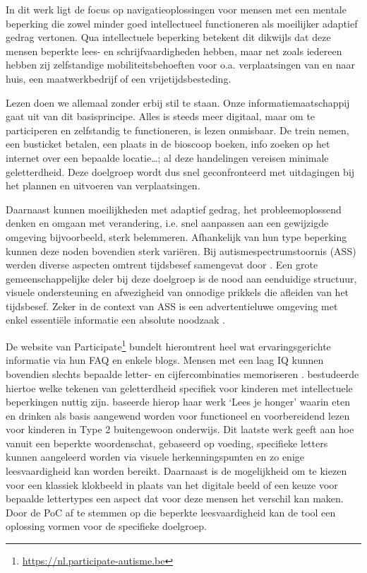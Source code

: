 In dit werk ligt de focus op navigatieoplossingen voor mensen met een mentale beperking die zowel minder goed intellectueel functioneren als moeilijker adaptief gedrag vertonen. Qua intellectuele beperking betekent dit dikwijls dat deze mensen beperkte lees- en schrijfvaardigheden hebben, maar net zoals iedereen hebben zij zelfstandige mobiliteitsbehoeften voor o.a. verplaatsingen van en naar huis, een maatwerkbedrijf of een vrijetijdsbesteding.

Lezen doen we allemaal zonder erbij stil te staan. Onze informatiemaatschappij gaat uit van dit basisprincipe. Alles is steeds meer digitaal, maar om te participeren en zelfstandig te functioneren, is lezen onmisbaar. De trein nemen, een busticket betalen, een plaats in de bioscoop boeken, info zoeken op het internet over een bepaalde locatie\ldots; al deze handelingen vereisen minimale geletterdheid. Deze doelgroep wordt dus snel geconfronteerd met uitdagingen bij het plannen en uitvoeren van verplaatsingen. 

Daarnaast kunnen moeilijkheden met adaptief gedrag, het probleemoplossend denken en omgaan met verandering, i.e. snel aanpassen aan een gewijzigde omgeving bijvoorbeeld, sterk belemmeren. Afhankelijk van hun type beperking kunnen deze noden bovendien sterk variëren. Bij autismespectrumstoornis (ASS) werden diverse aspecten omtrent tijdsbesef samengevat door \textcite{Degrieck2014}. Een grote gemeenschappelijke deler bij deze doelgroep is de nood aan eenduidige structuur, visuele ondersteuning en afwezigheid van onnodige prikkels die afleiden van het tijdsbesef. Zeker in de context van ASS is een advertentieluwe omgeving met enkel essentiële informatie een absolute noodzaak \autocite{Roeyers2014}. 

De website van Participate\footnote{\url{https://nl.participate-autisme.be}} bundelt hieromtrent heel wat ervaringsgerichte informatie via hun FAQ en enkele blogs. Mensen met een laag IQ kunnen bovendien slechts bepaalde letter- en cijfercombinaties memoriseren \autocite{DeGraaf2001, Tytgat2014}. \textcite{Tilborg2018} bestudeerde hiertoe welke tekenen van geletterdheid specifiek voor kinderen met intellectuele beperkingen nuttig zijn. \textcite{Uyttersprot2021} baseerde hierop haar werk `Lees je honger' waarin eten en drinken als basis aangewend worden voor functioneel en voorbereidend lezen voor kinderen in Type 2 buitengewoon onderwijs. Dit laatste werk geeft aan hoe vanuit een beperkte woordenschat, gebaseerd op voeding, specifieke letters kunnen aangeleerd worden via visuele herkenningspunten en zo enige leesvaardigheid kan worden bereikt. Daarnaast is de mogelijkheid om te kiezen voor een klassiek klokbeeld in plaats van het digitale beeld of een keuze voor bepaalde lettertypes een aspect dat voor deze mensen het verschil kan maken. Door de PoC af te stemmen op die beperkte leesvaardigheid kan de tool een oplossing vormen voor de specifieke doelgroep. 

